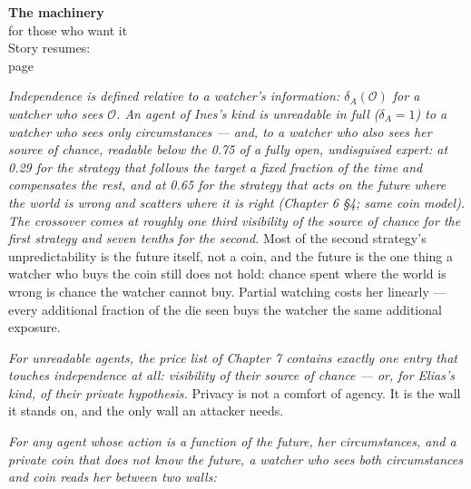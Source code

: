 \begin{machinery}{\textbf{The machinery}\\for those who want it\\[3pt]{\color{muted}Story resumes:\\page~\pageref{ch9}}}



\label{claim-11}

\noindent \emph{Independence is
defined relative to a watcher's information: \(\delta_A(\mathcal{O})\) for a watcher who
sees \(\mathcal{O}\). An agent of Ines's kind is unreadable in full (\(\delta_A = 1\)) to a
watcher who sees only circumstances --- and, to a watcher who also sees
her source of chance, readable below the 0.75 of a fully open,
undisguised expert: at 0.29 for the strategy that follows the target a
fixed fraction of the time and compensates the rest, and at 0.65 for
the strategy that acts on the future where the world is wrong and
scatters where it is right (Chapter 6 §4; same coin model). The
crossover comes at roughly one third visibility of the source of
chance for the first strategy and seven tenths for the second.} Most
of the second strategy's unpredictability is the future itself, not a
coin, and the future is the one thing a watcher who buys the coin
still does not hold: chance spent where the world is wrong is chance
the watcher cannot buy.
Partial
watching costs her linearly --- every additional fraction of the die
seen buys the watcher the same additional exposure.


\label{claim-12}

\noindent \emph{For unreadable
agents, the price list of Chapter 7 contains exactly one entry that
touches independence at all: visibility of their source of chance ---
or, for Elias's kind, of their private hypothesis.} Privacy is not a
comfort of agency. It is the wall it stands on, and the only wall an
attacker needs.


\label{claim-13}

\noindent \emph{For any agent whose action is a function of
the future, her circumstances, and a private coin that does not know
the future, a watcher who sees both circumstances and coin reads her
between two walls:}


\end{machinery}

